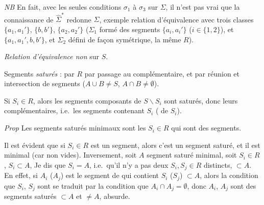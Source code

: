 \documentclass[11pt,a4paper]{article}
\begin{document}
\emph{NB} En fait, avec les seules conditions $\sigma_{1}$ à $\sigma_{3}$ sur
$\Sigma$, il n'est pas vrai que la connaissance de $\widehat{\Sigma}^{*}$
redonne $\Sigma$, exemple relation d'équivalence  avec
trois classes $\{a_{1},a_{1}'\}$, $\{b,b'\}$, $\{a_{2},a_{2}'\}$ \add{\ill{}} ($\Sigma_{1}$
formé des segments $\{a_{i},a_{i}'\}$ ($i\in\{1,2\}$), et
$\{a_{1},a_{1}',b,b'\}$, et $\Sigma_{2}$ défini de façon symétrique,
 la même $R$).



\emph{Relation d'équivalence non } sur $S$.

Segments \emph{saturés} :  par $R$ \ill{} par
passage au complémentaire, et par réunion et intersection de segments
 ($A\cup B\neq S$, $A\cap B\neq\emptyset$).

Si $S_{i}\in R$, alors les segments composants de $S\smallsetminus S_{i}$
sont saturés, donc \ill{} leurs complémentaires, i.e.\ les segments
 contenant $S_{i}$ \ill{}  (\ill{}
 de $S_{i}$). 

\emph{Prop} Les segments saturés minimaux sont les $S_{i}\in R$ qui sont des
segments.

Il est évident que si $S_{i}\in R$ est un segment, alors c'est un segment
saturé, et il est minimal (car \ill{} non vides). Inversement, soit $A$
segment saturé minimal, \struck{\ill{}} soit $S_{i}\in R$, $S_{i}\subset A$,
 Je dis que $S_{i}=A$, \struck{\ill{}} i.e.\ qu'il n'y a pas deux
$S_{i},S_{j}\in R$ distincts, $\subset A$. En effet, si $A_{i}$ ($A_{j}$) est
le segment \ill{}  de \ill{} qui contient $S_{i}$
($S_{j}$) \ill{} $\subset A$, alors la condition que $S_{i}$, $S_{j}$ sont
\ill{} se traduit par la condition \struck{\ill{}} que $A_{i}\cap
A_{j}=\emptyset$, donc $A_{i}$, $A_{j}$ sont des segments saturés $\subset A$
et $\neq A$, absurde.
\end{document}

